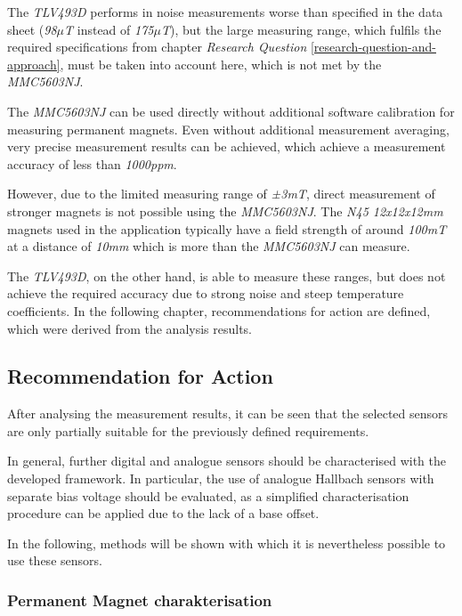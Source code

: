 The \emph{TLV493D} performs in noise measurements worse than specified
in the data sheet (\emph{98\(\mu\)T} instead of \emph{175\(\mu\)T}), but
the large measuring range, which fulfils the required specifications
from chapter \emph{Research Question}
\ref{research-question-and-approach}, must be taken into account here,
which is not met by the \emph{MMC5603NJ}.

The \emph{MMC5603NJ} can be used directly without additional software
calibration for measuring permanent magnets. Even without additional
measurement averaging, very precise measurement results can be achieved,
which achieve a measurement accuracy of less than \emph{1000\gls{ppm}}.

However, due to the limited measuring range of \emph{±3mT}, direct
measurement of stronger magnets is not possible using the
\emph{MMC5603NJ}. The \emph{N45 12x12x12mm} magnets used in the
application typically have a field strength of around \emph{100mT} at a
distance of \emph{10mm} which is more than the \emph{MMC5603NJ} can
measure.

The \emph{TLV493D}, on the other hand, is able to measure these ranges,
but does not achieve the required accuracy due to strong noise and steep
temperature coefficients. In the following chapter, recommendations for
action are defined, which were derived from the analysis results.

\hypertarget{recommendation-for-action}{%
\subsection{Recommendation for Action}\label{recommendation-for-action}}

After analysing the measurement results, it can be seen that the
selected sensors are only partially suitable for the previously defined
requirements.

In general, further digital and analogue sensors should be characterised
with the developed framework. In particular, the use of analogue
Hallbach sensors with separate bias voltage should be evaluated, as a
simplified characterisation procedure can be applied due to the lack of
a base offset.

In the following, methods will be shown with which it is nevertheless
possible to use these sensors.

\hypertarget{permanent-magnet-charakterisation}{%
\subsubsection{Permanent Magnet
charakterisation}\label{permanent-magnet-charakterisation}}


